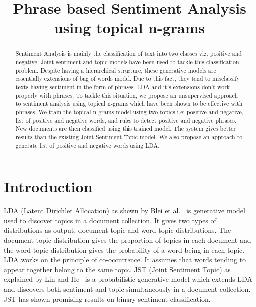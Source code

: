 \documentclass[11pt]{article}
\title{Phrase based Sentiment Analysis using topical n-grams}
\date{}
\begin{document}
\maketitle
\begin{abstract}
Sentiment Analysis is mainly the classification of text into two classes viz. 
positive and negative. Joint sentiment and topic models have been used to 
tackle this classification problem.  Despite having a hierarchical structure, 
these generative models are essentially extensions of bag of words model. Due 
to this fact, they tend to misclassify texts having sentiment in the form of 
phrases. LDA and it's extensions don't work properly with phrases. To tackle 
this situation, we propose an unsupervised approach to sentiment analysis using 
topical n-grams which have been shown to be effective with phrases. We train 
the topical n-grams model using two topics i.e; positive and negative, list of
positive and negative words, and rules to detect positive and negative phrases. 
New documents are then classified using this trained model. The system gives 
better results than the existing Joint Sentiment Topic model. We also propose 
an approach to generate list of positive and negative words using LDA.

\end{abstract}

\section{Introduction}


\indent LDA (Latent Dirichlet Allocation) as shown by Blei et al.~ 
is generative model used to discover topics in a document collection. It gives two types of 
distributions as output, document-topic and word-topic distributions. The document-topic
distribution gives the proportion of topics in each document and the word-topic 
distribution gives the probability of a word being in each topic. LDA works on the 
principle of co-occurrence. It assumes that words tending to appear together belong 
to the same topic. JST (Joint Sentiment Topic) as explained by Lin and He~ 
is a probabilistic generative model which extends LDA and discovers both sentiment 
and topic simultaneously in a document collection. JST has shown promising results 
on binary sentiment classification. 
\end{document}
